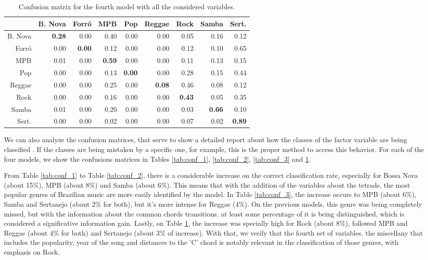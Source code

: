 \documentclass[twocolumn]{article}
\begin{document}
\begin{table}[ht]
\caption{Confusion matrix for the fourth model with all the considered variables.}
\small
\vspace{3mm}
 \setlength\tabcolsep{1.5pt}
\centering
\begin{tabular}{rrrrrrrrr}
 & B. Nova & Forró & MPB & Pop & Reggae & Rock & Samba & Sert. \\ 
  \hline
B. Nova  & \textbf{0.28} & 0.00 & 0.40 & 0.00 & 0.00 & 0.05 & 0.16 & 0.12 \\ 
  Forró     & 0.00 & \textbf{0.00} & 0.12 & 0.00 & 0.00 & 0.12 & 0.10 & 0.65 \\ 
  MPB       & 0.01 & 0.00 & \textbf{0.59} & 0.00 & 0.00 & 0.11 & 0.13 & 0.15 \\ 
  Pop       & 0.00 & 0.00 & 0.13 & \textbf{0.00} & 0.00 & 0.28 & 0.15 & 0.44 \\ 
  Reggae    & 0.00 & 0.00 & 0.25 & 0.00 & \textbf{0.08} & 0.46 & 0.08 & 0.12 \\ 
  Rock      & 0.00 & 0.00 & 0.16 & 0.00 & 0.00 & \textbf{0.43} & 0.05 & 0.35 \\ 
  Samba     & 0.01 & 0.00 & 0.20 & 0.00 & 0.00 & 0.03 & \textbf{0.66} & 0.10 \\ 
  Sert. & 0.00 & 0.00 & 0.02 & 0.00 & 0.00 & 0.07 & 0.02 & \textbf{0.89} \\

     \hline
\end{tabular}
\label{tab:conf_4}
\end{table}

We can also analyze the confusion matrices, 
that serve to show a detailed
report about how the classes of the factor variable
are being classified \cite{Hastie}. If the classes 
are being mistaken by a specific one, for example, this is 
the proper method to access this behavior. 
For each of the four models, we 
show the confusions matrices in Tables
\ref{tab:conf_1}, \ref{tab:conf_2}, \ref{tab:conf_3}  
and \ref{tab:conf_4}.

From Table \ref{tab:conf_1} to Table \ref{tab:conf_2},
there is a considerable increase on the correct 
classification rate, especially for Bossa Nova
(about 15\%), MPB (about 8\%) and Samba (about 6\%). 
This means that with the addition of the variables
about the tetrads, the most popular genres of Brazilian music are more easily identified by the model. In Table
\ref{tab:conf_3}, the increase occurs to MPB (about 6\%), 
Samba and Sertanejo (about 2\% for both), but it's more
intense for Reggae (4\%). On the previous models, this 
genre was being completely missed, but with the
information about the common chords transitions, at least 
some percentage of it is being distinguished, which 
is considered a significative information gain. Lastly,
on Table \ref{tab:conf_4}, the increase was specially high
for Rock (about 8\%), followed MPB and Reggae
(about 4\% for both) and Sertanejo (about 3\% of increase).
With that, we verify that the fourth set of variables, 
the miscellany that includes the popularity, year of the 
song and distances to the 'C' chord is notably relevant
in the classification of those genres, with emphasis 
on Rock.
\end{document}
